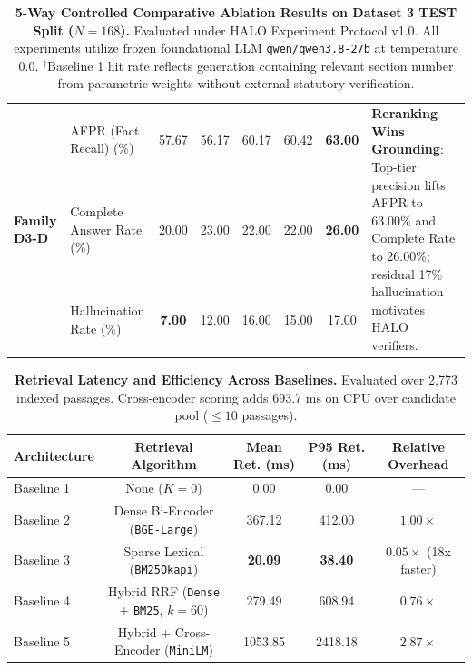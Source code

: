 \begin{table}[t]
\begin{tabular}{llcccccp{4.2cm}}
\midrule
\multirow{3}{*}{\textbf{Family D3-D}} & AFPR (Fact Recall) (\%) & 57.67 & 56.17 & 60.17 & 60.42 & \textbf{63.00} & \multirow{3}{4.2cm}{\textbf{Reranking Wins Grounding}: Top-tier precision lifts AFPR to 63.00\% and Complete Rate to 26.00\%; residual 17\% hallucination motivates HALO verifiers.} \\
\textit{Grounded Answering} & Complete Answer Rate (\%) & 20.00 & 23.00 & 22.00 & 22.00 & \textbf{26.00} & \\
($N = 100$) & Hallucination Rate (\%) & \textbf{7.00} & 12.00 & 16.00 & 15.00 & 17.00 & \\
\bottomrule
\end{tabular}
\caption{\textbf{5-Way Controlled Comparative Ablation Results on Dataset 3 TEST Split ($N = 168$).} Evaluated under HALO Experiment Protocol v1.0. All experiments utilize frozen foundational LLM \texttt{qwen/qwen3.8-27b} at temperature 0.0. $^\dagger$Baseline 1 hit rate reflects generation containing relevant section number from parametric weights without external statutory verification.}
\label{tab:comparative_ablation}
\end{table}

\vspace{1em}

\begin{table}[h]
\centering
\small
\begin{tabular}{lcccc}
\toprule
\textbf{Architecture} & \textbf{Retrieval Algorithm} & \textbf{Mean Ret. (ms)} & \textbf{P95 Ret. (ms)} & \textbf{Relative Overhead} \\
\midrule
Baseline 1 & None ($K=0$) & 0.00 & 0.00 & --- \\
Baseline 2 & Dense Bi-Encoder (\texttt{BGE-Large}) & 367.12 & 412.00 & $1.00\times$ \\
Baseline 3 & Sparse Lexical (\texttt{BM25Okapi}) & \textbf{20.09} & \textbf{38.40} & $0.05\times$ (18x faster) \\
Baseline 4 & Hybrid RRF (\texttt{Dense} + \texttt{BM25}, $k=60$) & 279.49 & 608.94 & $0.76\times$ \\
Baseline 5 & Hybrid + Cross-Encoder (\texttt{MiniLM}) & 1053.85 & 2418.18 & $2.87\times$ \\
\bottomrule
\end{tabular}
\caption{\textbf{Retrieval Latency and Efficiency Across Baselines.} Evaluated over 2,773 indexed passages. Cross-encoder scoring adds 693.7 ms on CPU over candidate pool ($\le 10$ passages).}
\label{tab:latency_profile}
\end{table}

